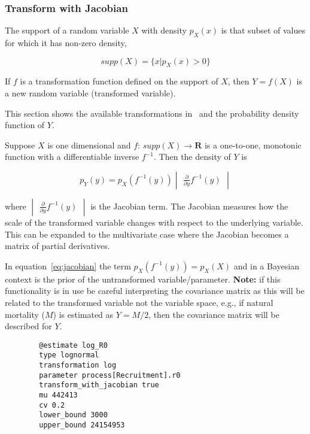 \subsubsection*{Transform with Jacobian}

The support of a random variable $X$ with density $p_X(x)$ is that subset of values for which it has non-zero density,

\begin{equation}
  supp(X) = \{x|p_X(x) > 0\}
\end{equation}

If $f$ is a transformation function defined on the support of $X$, then $Y = f(X)$ is a new random variable (transformed variable).

This section shows the available transformations in \CNAME\ and the probability density function of $Y$. %

Suppose $X$ is one dimensional and $f$: $supp(X) \to \mathbf{R}$ is a one-to-one, monotonic function with a differentiable inverse $f^{-1}$. Then the density of $Y$ is

\begin{equation}\label{eq:jacobian}
	p_Y(y) = p_X(f^{-1}(y)) \begin{vmatrix} \frac{\partial}{\partial y} f^{-1}(y) \end{vmatrix}
\end{equation}

where $\begin{vmatrix} \frac{\partial}{\partial y} f^{-1}(y) \end{vmatrix}$ is the Jacobian term. The Jacobian measures how the scale of the transformed variable changes with respect to the underlying variable. This can be expanded to the multivariate case where the Jacobian becomes a matrix of partial derivatives.

In equation~\ref{eq:jacobian} the term $p_X(f^{-1}(y)) = p_X(X)$ and in a Bayesian context is the prior of the untransformed variable/parameter. \textbf{Note:} if this functionality is in use be careful interpreting the covariance matrix as this will be related to the transformed variable not the variable space, e.g., if natural mortality ($M$) is estimated as $Y = M/2$, then the covariance matrix will be described for $Y$.

{\small{\begin{verbatim}
		@estimate log_R0
		type lognormal
		transformation log
		parameter process[Recruitment].r0
		transform_with_jacobian true
		mu 442413
		cv 0.2
		lower_bound 3000
		upper_bound 24154953
\end{verbatim}}}

